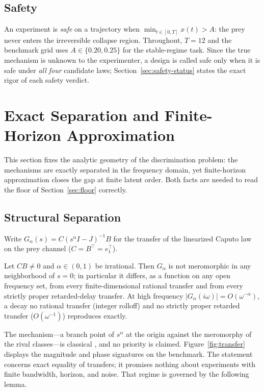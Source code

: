 \documentclass[mathematics,article,accept,pdftex,moreauthors]{Definitions/mdpi}
\begin{document}
\subsection{Safety}

An experiment is \emph{safe} on a trajectory when $\min_{t\in[0,T]}x(t)>A$: the prey never enters the irreversible collapse region. Throughout, $T=12$ and the benchmark grid uses $A\in\{0.20,0.25\}$ for the stable-regime task. Since the true mechanism is unknown to the experimenter, a design is called safe only when it is safe under \emph{all four} candidate laws; Section~\ref{sec:safety-status} states the exact rigor of each safety verdict.

\section{Exact Separation and Finite-Horizon Approximation}
\label{sec:sep}

This section fixes the analytic geometry of the discrimination problem: the mechanisms are exactly separated in the frequency domain, yet finite-horizon approximation closes the gap at finite latent order. Both facts are needed to read the floor of Section~\ref{sec:floor} correctly.

\subsection{Structural Separation}

Write $G_{\alpha}(s)=C\left(s^{\alpha}I-J\right)^{-1}B$ for the transfer of the linearized Caputo law on the prey channel ($C=B^{\top}=e_{1}^{\top}$).

\begin{Theorem}
\label{thm:sep}
Let $CB\neq0$ and $\alpha\in(0,1)$ be irrational. Then $G_{\alpha}$ is not meromorphic in any neighborhood of $s=0$; in particular it differs, as a function on any open frequency set, from every finite-dimensional rational transfer and from every strictly proper retarded-delay transfer. At high frequency $|G_{\alpha}(i\omega)|=O(\omega^{-\alpha})$, a decay no rational transfer (integer rolloff) and no strictly proper retarded transfer ($O(\omega^{-1})$) reproduces exactly.
\end{Theorem}

The mechanism---a branch point of $s^{\alpha}$ at the origin against the meromorphy of the rival classes---is classical \cite{Matignon1996,Petras2011}, and no priority is claimed. Figure~\ref{fig:transfer} displays the magnitude and phase signatures on the benchmark. The statement concerns exact equality of transfers; it promises nothing about experiments with finite bandwidth, horizon, and noise. That regime is governed by the following lemma.
\end{document}
